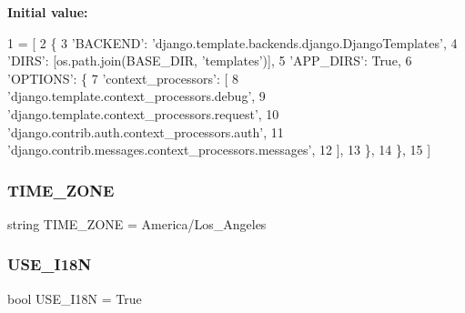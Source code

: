 {\bfseries Initial value\+:}
\begin{DoxyCode}
1 =  [
2     \{
3         \textcolor{stringliteral}{'BACKEND'}: \textcolor{stringliteral}{'django.template.backends.django.DjangoTemplates'},
4         \textcolor{stringliteral}{'DIRS'}: [os.path.join(BASE\_DIR, \textcolor{stringliteral}{'templates'})],
5         \textcolor{stringliteral}{'APP\_DIRS'}: \textcolor{keyword}{True},
6         \textcolor{stringliteral}{'OPTIONS'}: \{
7             \textcolor{stringliteral}{'context\_processors'}: [
8                 \textcolor{stringliteral}{'django.template.context\_processors.debug'},
9                 \textcolor{stringliteral}{'django.template.context\_processors.request'},
10                 \textcolor{stringliteral}{'django.contrib.auth.context\_processors.auth'},
11                 \textcolor{stringliteral}{'django.contrib.messages.context\_processors.messages'},
12             ],
13         \},
14     \},
15 ]
\end{DoxyCode}
\mbox{\label{namespacedynamicfiltersite_1_1settings_a037ffded91b7904e73dda92d116594c6}} 
\subsubsection{\texorpdfstring{T\+I\+M\+E\+\_\+\+Z\+O\+NE}{TIME\_ZONE}}
{\footnotesize\ttfamily string T\+I\+M\+E\+\_\+\+Z\+O\+NE = \textquotesingle{}America/Los\+\_\+\+Angeles\textquotesingle{}}

\mbox{\label{namespacedynamicfiltersite_1_1settings_aa385f7186a262f3a197d89b86cd5b44f}} 
\subsubsection{\texorpdfstring{U\+S\+E\+\_\+\+I18N}{USE\_I18N}}
{\footnotesize\ttfamily bool U\+S\+E\+\_\+\+I18N = True}

\mbox{\label{namespacedynamicfiltersite_1_1settings_a2578e043379f868f8693d8299d915972}} 
